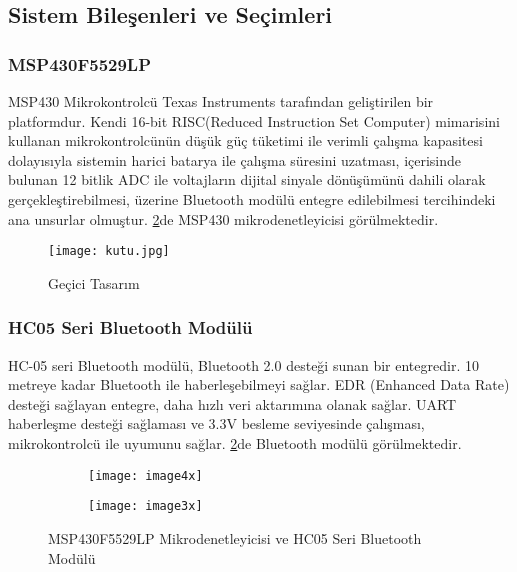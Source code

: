 \subsection{Sistem Bileşenleri ve Seçimleri}

\subsubsection{MSP430F5529LP}
MSP430 Mikrokontrolcü Texas Instruments tarafından geliştirilen bir platformdur. Kendi 16-bit RISC(Reduced Instruction Set Computer) mimarisini kullanan mikrokontrolcünün düşük güç tüketimi ile verimli çalışma kapasitesi dolayısıyla sistemin harici batarya ile çalışma süresini uzatması, içerisinde bulunan 12 bitlik ADC ile voltajların dijital sinyale dönüşümünü dahili olarak gerçekleştirebilmesi, üzerine Bluetooth modülü entegre edilebilmesi tercihindeki ana unsurlar olmuştur. \ref{fig:MSP_HC05}de MSP430 mikrodenetleyicisi görülmektedir.

\begin{figure}[H]
    \centering
    \texttt{[image: kutu.jpg]}
    \caption{Geçici Tasarım}
    \label{fig:gecici}
\end{figure}

\subsubsection{HC05 Seri Bluetooth Modülü}
HC-05 seri Bluetooth modülü, Bluetooth 2.0 desteği sunan bir entegredir. 10 metreye kadar Bluetooth ile haberleşebilmeyi sağlar. EDR (Enhanced Data Rate) desteği sağlayan entegre, daha hızlı veri aktarımına olanak sağlar. UART haberleşme desteği sağlaması ve 3.3V besleme seviyesinde çalışması, mikrokontrolcü ile uyumunu sağlar. \ref{fig:MSP_HC05}de Bluetooth modülü görülmektedir.

\begin{figure}[H]
    \centering
    \begin{subfigure}{0.45\textwidth}
        \centering
        \texttt{[image: image4x]} %
    \end{subfigure}
    \hfill
    \begin{subfigure}{0.45\textwidth}
        \centering
        \texttt{[image: image3x]} %
    \end{subfigure}
    \caption{MSP430F5529LP Mikrodenetleyicisi ve HC05 Seri Bluetooth Modülü}
    \label{fig:MSP_HC05}
\end{figure}



